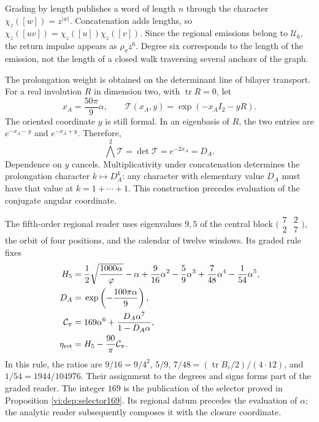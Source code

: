 Grading by length publishes a word of length \(n\)
through the character \(\chi_z([w])=z^{|w|}\). Concatenation
adds lengths, so
\(\chi_z([uv])=\chi_z([u])\chi_z([v])\). Since the regional
emissions belong to \(\mathcal U_6\), the return impulse
appears as \(\rho_\pi z^6\). Degree six corresponds to the
length of the emission, not the length of a closed walk
traversing several anchors of the graph.

The prolongation weight is obtained on the determinant line of
bilayer transport. For a real involution \(R\) in dimension two,
with \(\operatorname{tr}R=0\), let
\[
 x_A=\frac{50\pi}{9}\alpha,\qquad
 \mathcal T(x_A,y)=\exp(-x_AI_2-yR).
\]
The oriented coordinate \(y\) is still formal. In an eigenbasis
of \(R\), the two entries are \(e^{-x_A-y}\) and
\(e^{-x_A+y}\). Therefore,
\[
 \bigwedge^2\mathcal T=\det\mathcal T
 =e^{-2x_A}=D_A.
\]
Dependence on \(y\) cancels. Multiplicativity under
concatenation determines the prolongation character \(k\mapsto D_A^k\):
any character with elementary value \(D_A\) must have that value
at \(k=1+\cdots+1\). This construction precedes evaluation
of the conjugate angular coordinate.

The fifth-order regional reader uses eigenvalues \(9,5\)
of the central block \(\bigl(\begin{smallmatrix}7&2\\2&7\end{smallmatrix}\bigr)\),
the orbit of four positions, and the calendar of twelve windows.
Its graded rule fixes
\begin{align}
 H_5={}&\frac12\sqrt{\frac{1000\alpha}{\varphi}}-\alpha
       +\frac9{16}\alpha^2-\frac59\alpha^3
       +\frac7{48}\alpha^4-\frac1{54}\alpha^5,\notag\\
 D_A={}&\exp\left(-\frac{100\pi\alpha}{9}\right),\notag\\
 \mathcal C_\pi={}&169\alpha^6+
                  \frac{D_A\alpha^7}{1-D_A\alpha},\notag\\
 \eta_{\rm ret}={}&H_5-\frac{90}{\pi}\mathcal C_\pi.
 \label{vi:dep:mantisas}
\end{align}
In this rule, the ratios are
\(9/16=9/4^2\), \(5/9\), \(7/48=(\operatorname{tr}B_c/2)/(4\cdot12)\),
and \(1/54=1944/104976\). Their assignment to the degrees and signs
forms part of the graded reader. The integer \(169\) is the publication
of the selector proved in Proposition \ref{vi:dep:selector169}.
Its regional datum precedes the evaluation of \(\alpha\); the
analytic reader subsequently composes it with the closure coordinate.

